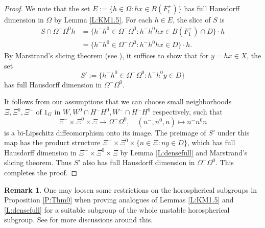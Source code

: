 \documentclass[reqno,12pt]{amsart}
\theoremstyle{definition}
\newtheorem{remark}[theorem]{Remark}
\numberwithin{equation}{section}
\newcommand {\comm}[1]   {\textcolor{red}{#1}}
\begin{document}
{\begin{proof}
    
    We note that the set $E:=\{h\in\Omega:hx\in B(F_1^+)\}$ has full Hausdorff dimension in $\Omega$ by Lemma \ref{L:KM1.5}. For each $h\in E$, the slice of $S$ is \begin{equation*}
        \begin{aligned}
            S\cap \Omega^-\Omega^0h&=\{h^-h^0\in \Omega^-\Omega^0:h^-h^0hx\in B(F_1^+)\cap D\}\cdot h\\
            &=\{h^-h^0\in \Omega^-\Omega^0:h^-h^0hx\in D\}\cdot h.
        \end{aligned}
    \end{equation*}
    By Marstrand's slicing theorem (see \cite[Lemma 1.4]{KM96}),
    it suffices to show that for $y=hx\in X$, the set $$
    S':=\{h^-h^0\in \Omega^-\Omega^0:h^-h^0y\in D\}
    $$
    has full Hausdorff dimension in $\Omega^-\Omega^0$.

    It follows from our assumptions
    that we can choose small neighborhoods $\Xi,\Xi^0,\Xi^-$ of $1_G$ in $W,W^0\cap H^-H^0,W^-\cap H^-H^0$ respectively, such that $$
    \Xi^-\times \Xi^0\times \Xi\to \Omega^-\Omega^0,\quad (n^-,n^0,n)\mapsto n^-n^0n
    $$
    is a bi-Lipschitz diffeomorphism onto its image. The preimage of $S'$ under this map has the product structure $\Xi^-\times \Xi^0\times\{n\in\Xi: ny\in D\}$, which has full Hausdorff dimension in $\Xi^-\times \Xi^0\times \Xi$ by Lemma \ref{L:densefull} and Marstrand's slicing theorem. Thus $S'$ also has full Hausdorff dimension in $\Omega^-\Omega^0$. This completes the proof. 
\end{proof}

\begin{remark}
    One may loosen some restrictions on the horospherical subgroups in Proposition \ref{P:Thm0} when {proving} analogues of Lemmas \ref{L:KM1.5} and \ref{L:densefull} for a suitable subgroup of the whole unstable horospherical subgroup. See \cite{shi20} for more discussions around this.
\end{remark}



}
\end{document}
